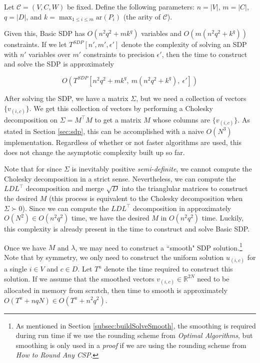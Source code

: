 Let $\mathcal{C} = (V,C,W)$ be fixed. Define the following parameters: $n = |V|$, $m = |C|$, $q = |D|$, and $ k = \max_{1\leq i \leq m}\text{ar}(P_i)$ (the arity of $\mathcal{C}$).

Given this, Basic SDP has $O(n^2q^2 + mk^q)$ variables and $ O(m (n^2q^2 + k^q))$ constraints. If we let $T^{SDP}\left[{n',m',\epsilon'}\right]$ denote the complexity of solving an SDP with $n'$ variables over $m'$ constraints to precision $\epsilon'$, then the time to construct and solve the SDP is approximately

\begin{equation}
O( T^{SDP}\left[n^2q^2 + mk^q,~ m (n^2q^2 + k^q),~\epsilon'\right])
\end{equation}

After solving the SDP, we have a matrix $\Sigma$, but we need a collection of vectors $\{v_{(i,c)}\}$. We get this collection of vectors by performing a Cholesky decomposition on $\Sigma = M^\intercal M$ to get a matrix $M$ whose columns are $\{v_{(i,c)}\}$. As stated in Section \ref{sec:sdp}, this can be accomplished with a naive $O(N^3)$ implementation. Regardless of whether or not faster algorithms are used, this does not change the asymptotic complexity built up so far.

Note that for since $\Sigma$ is inevitably positive \textit{semi-definite}, we cannot compute the Cholesky decomposition in a strict sense. Nevertheless, we can compute the $LDL^\intercal$ decomposition and merge $\sqrt{D}$ into the trianglular matrices to construct the desired $M$ (this process is equivalent to the Cholesky decomposition when $\Sigma \succ 0$). Since we can compute the $LDL^\intercal$ decomposition in approximately $O(N^2) \in O(n^2q^2)$ time, we have the desired $M$ in $O(n^2q^2)$ time. Luckily, this complexity is already present in the time to construct and solve Basic SDP.


Once we have $M$ and $\lambda$, we may need to construct a ``smooth" SDP solution.\footnote{As mentioned in Section \ref{subsec:buildSolveSmooth}, the smoothing is required during run time if we use the rounding scheme from \textit{Optimal Algorithms}, but smoothing is only used in a \textit{proof} if we are using the rounding scheme from \textit{How to Round Any CSP}.}  Note that by symmetry, we only need to construct the uniform solution $u_{(i,c)}$ for a single $i \in V$ and $c \in D$. Let $T^u$ denote the time required to construct this solution. If we assume that the smoothed vectors $v_{(i,c)} \in \mathbb{R}^{2N}$ need to be allocated in memory from scratch, then time to smooth is approximately $O(T^u + nq N) \in O(T^u + n^2q^2)$.

